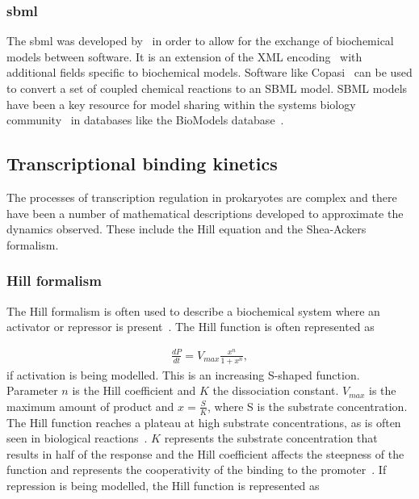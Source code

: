 \subsubsection{\acrfull{sbml}}

The \acrfull{sbml} was developed by~\textcite{Hucka:2003wg} in order to allow for the exchange of biochemical models between software. It is an extension of the XML encoding~\autocite{DuCharme:1999} with additional fields specific to biochemical models. Software like Copasi~\autocite{Hoops:2006gy} can be used to convert a set of coupled chemical reactions to an SBML model. SBML models have been a key resource for model sharing within the systems biology community~\autocite{Wilkinson:2006td} in databases like the BioModels database~\autocite{LeNovere:2006ep}. 

\subsection{Transcriptional binding kinetics}

The processes of transcription regulation in prokaryotes are complex and there have been a number of mathematical descriptions developed to approximate the dynamics observed. These include the Hill equation and the Shea-Ackers formalism. 

\subsubsection{Hill formalism}
\label{sec:hill}
The Hill formalism is often used to describe a biochemical system where an activator or repressor is present~\autocite{Hill:1910vo}. The Hill function is often represented as

\begin{align*}
	\frac{dP}{dt} = V_{max}\frac{x^n}{1 + x^n},
\end{align*}
\noindent if activation is being modelled. This is an increasing S-shaped function. Parameter $n$ is the Hill coefficient and $K$ the dissociation constant. $V_{max}$ is the maximum amount of product and $x = \frac{S}{K}$, where S is the substrate concentration. The Hill function reaches a plateau at high substrate concentrations, as is often seen in biological reactions~\autocite{Alon:2007}. $K$ represents the substrate concentration that results in half of the response and the Hill coefficient affects the steepness of the function and represents the cooperativity of the binding to the promoter~\autocite{Alon:2007}. If repression is being modelled, the Hill function is represented as

